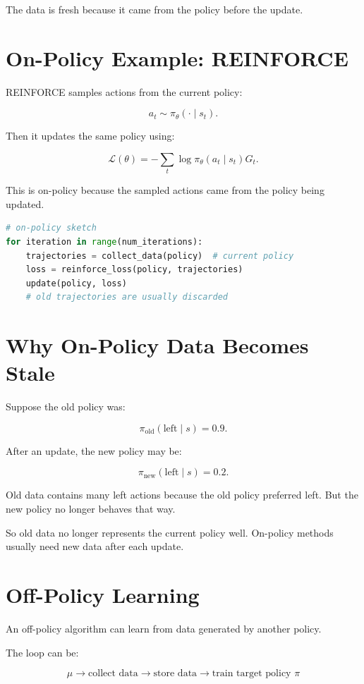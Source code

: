 \documentclass[11pt]{article}
\begin{document}
The data is fresh because it came from the policy before the update.

\section{On-Policy Example: REINFORCE}

REINFORCE samples actions from the current policy:

\[
a_t \sim \pi_\theta(\cdot \mid s_t).
\]

Then it updates the same policy using:

\[
\mathcal{L}(\theta)
=
-\sum_t \log \pi_\theta(a_t \mid s_t)G_t.
\]

This is on-policy because the sampled actions came from the policy being updated.

\begin{lstlisting}[language=Python]
# on-policy sketch
for iteration in range(num_iterations):
    trajectories = collect_data(policy)  # current policy
    loss = reinforce_loss(policy, trajectories)
    update(policy, loss)
    # old trajectories are usually discarded
\end{lstlisting}

\section{Why On-Policy Data Becomes Stale}

Suppose the old policy was:

\[
\pi_{\text{old}}(\text{left} \mid s) = 0.9.
\]

After an update, the new policy may be:

\[
\pi_{\text{new}}(\text{left} \mid s) = 0.2.
\]

Old data contains many left actions because the old policy preferred left.
But the new policy no longer behaves that way.

So old data no longer represents the current policy well.
On-policy methods usually need new data after each update.

\section{Off-Policy Learning}

An off-policy algorithm can learn from data generated by another policy.

The loop can be:

\[
\mu
\rightarrow
\text{collect data}
\rightarrow
\text{store data}
\rightarrow
\text{train target policy } \pi
\]
\end{document}
